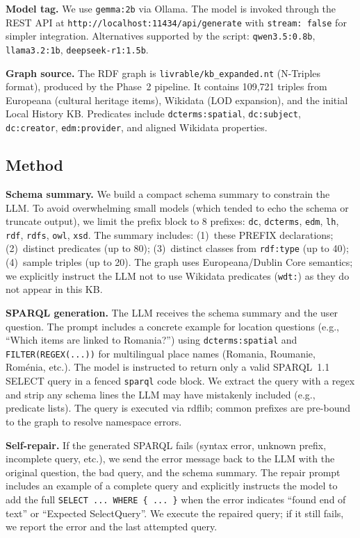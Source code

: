 \documentclass[11pt,a4paper]{article}
\begin{document}
  \textbf{Model tag.} We use \texttt{gemma:2b} via Ollama. The model is invoked through the REST API at \texttt{http://localhost:11434/api/generate} with \texttt{stream: false} for simpler integration. Alternatives supported by the script: \texttt{qwen3.5:0.8b}, \texttt{llama3.2:1b}, \texttt{deepseek-r1:1.5b}.

  \textbf{Graph source.} The RDF graph is \texttt{livrable/kb\_expanded.nt} (N-Triples format), produced by the Phase~2 pipeline. It contains 109,721 triples from Europeana (cultural heritage items), Wikidata (LOD expansion), and the initial Local History KB. Predicates include \texttt{dcterms:spatial}, \texttt{dc:subject}, \texttt{dc:creator}, \texttt{edm:provider}, and aligned Wikidata properties.

  \subsection{Method}

  \textbf{Schema summary.} We build a compact schema summary to constrain the LLM. To avoid overwhelming small models (which tended to echo the schema or truncate output), we limit the prefix block to 8 prefixes: \texttt{dc}, \texttt{dcterms}, \texttt{edm}, \texttt{lh}, \texttt{rdf}, \texttt{rdfs}, \texttt{owl}, \texttt{xsd}. The summary includes: (1)~these PREFIX declarations; (2)~distinct predicates (up to 80); (3)~distinct classes from \texttt{rdf:type} (up to 40); (4)~sample triples (up to 20). The graph uses Europeana/Dublin Core semantics; we explicitly instruct the LLM not to use Wikidata predicates (\texttt{wdt:}) as they do not appear in this KB.

  \textbf{SPARQL generation.} The LLM receives the schema summary and the user question. The prompt includes a concrete example for location questions (e.g., ``Which items are linked to Romania?'') using \texttt{dcterms:spatial} and \texttt{FILTER(REGEX(...))} for multilingual place names (Romania, Roumanie, Roménia, etc.). The model is instructed to return only a valid SPARQL~1.1 SELECT query in a fenced \texttt{sparql} code block. We extract the query with a regex and strip any schema lines the LLM may have mistakenly included (e.g., predicate lists). The query is executed via rdflib; common prefixes are pre-bound to the graph to resolve namespace errors.

  \textbf{Self-repair.} If the generated SPARQL fails (syntax error, unknown prefix, incomplete query, etc.), we send the error message back to the LLM with the original question, the bad query, and the schema summary. The repair prompt includes an example of a complete query and explicitly instructs the model to add the full \texttt{SELECT ... WHERE \{ ... \}} when the error indicates ``found end of text'' or ``Expected SelectQuery''. We execute the repaired query; if it still fails, we report the error and the last attempted query.
\end{document}

